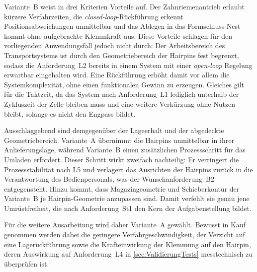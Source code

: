 Variante~B weist in drei Kriterien Vorteile auf. Der Zahnriemenantrieb erlaubt
kürzere Verfahrzeiten, die \emph{closed-loop}-Rückführung erkennt
Positionsabweichungen unmittelbar und das Ablegen in das Formschluss-Nest kommt
ohne aufgebrachte Klemmkraft aus. Diese Vorteile schlagen für den vorliegenden
Anwendungsfall jedoch nicht durch: Der Arbeitsbereich des Transportsystems ist
durch den Geometriebereich der Hairpins fest begrenzt, sodass die
Anforderung~L2 bereits in einem System mit einer \emph{open-loop} Regelung erwartbar eingehalten wird. Eine
Rückführung erhöht damit vor allem die Systemkomplexität, ohne einen
funktionalen Gewinn zu erzeugen. Gleiches gilt für die Taktzeit, da das System
nach Anforderung~L1 lediglich unterhalb der Zykluszeit der Zelle bleiben muss und
eine weitere Verkürzung ohne Nutzen bleibt, solange es nicht den Engpass bildet.

Ausschlaggebend sind demgegenüber der Lageerhalt und der abgedeckte
Geometriebereich. Variante~A übernimmt die Hairpins unmittelbar in ihrer
Anlieferungslage, während Variante~B einen zusätzlichen Prozessschritt für das
Umladen erfordert. Dieser Schritt wirkt zweifach nachteilig: Er verringert die
Prozessstabilität nach L5 und verlagert das Ausrichten der Hairpins zurück in die
Verantwortung des Bedienpersonals, was der Wunschanforderung~B2 entgegensteht.
Hinzu kommt, dass Magazingeometrie und Schieberkontur der Variante~B je
Hairpin-Geometrie anzupassen sind. Damit verfehlt sie genau jene
Umrüstfreiheit, die nach Anforderung~St1 den Kern der Aufgabenstellung bildet.

Für die weitere Ausarbeitung wird daher Variante~A gewählt. Bewusst in Kauf
genommen werden dabei die geringere Verfahrgeschwindigkeit, der Verzicht auf eine
Lagerückführung sowie die Krafteinwirkung der Klemmung auf den Hairpin, deren
Auswirkung auf Anforderung~L4 in \cref{sec:ValidierungTests} messtechnisch zu
überprüfen ist.

